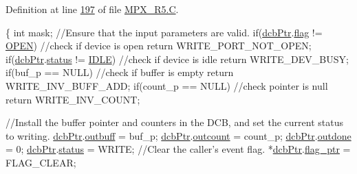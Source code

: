 Definition at line \hyperlink{_m_p_x___r5_8_c_source_l00197}{197} of file \hyperlink{_m_p_x___r5_8_c_source}{MPX\_\-R5.C}.




\begin{DoxyCode}
                                                \{
                \textcolor{keywordtype}{int} mask; 
                \textcolor{comment}{//Ensure that the input parameters are valid. }
                \textcolor{keywordflow}{if}(\hyperlink{_m_p_x___r5_8h_acf6724d515070007ff4ac39c32640311}{dcbPtr}.\hyperlink{structdevice_ac2d4a1d39c1a5a858d88f2482d6900c8}{flag} != \hyperlink{_m_p_x___r5_8h_a1354b70ac6803a06beebe84f61b5f95b}{OPEN}) \textcolor{comment}{//check if device is open }
                        \textcolor{keywordflow}{return} WRITE\_PORT\_NOT\_OPEN; 
                \textcolor{keywordflow}{if}(\hyperlink{_m_p_x___r5_8h_acf6724d515070007ff4ac39c32640311}{dcbPtr}.\hyperlink{structdevice_aaaefcdae0117d89bef5340a1e3f432e1}{status} != \hyperlink{_m_p_x___r5_8h_a9c21a7caee326d7803b94ae1952b27ca}{IDLE}) \textcolor{comment}{//check if device is idle }
                        \textcolor{keywordflow}{return} WRITE\_DEV\_BUSY; 
                \textcolor{keywordflow}{if}(buf\_p == NULL) \textcolor{comment}{//check if buffer is empty }
                        \textcolor{keywordflow}{return} WRITE\_INV\_BUFF\_ADD; 
                \textcolor{keywordflow}{if}(count\_p == NULL) \textcolor{comment}{//check pointer is null }
                        \textcolor{keywordflow}{return} WRITE\_INV\_COUNT; 
                
                \textcolor{comment}{//Install the buffer pointer and counters in the DCB, and set the
       current status to writing. }
                \hyperlink{_m_p_x___r5_8h_acf6724d515070007ff4ac39c32640311}{dcbPtr}.\hyperlink{structdevice_a32acea82810b51d93df2d3ced6cdffb7}{outbuff} = buf\_p; 
                \hyperlink{_m_p_x___r5_8h_acf6724d515070007ff4ac39c32640311}{dcbPtr}.\hyperlink{structdevice_ae597c46dee282a47174100b12525b424}{outcount} = count\_p; 
                \hyperlink{_m_p_x___r5_8h_acf6724d515070007ff4ac39c32640311}{dcbPtr}.\hyperlink{structdevice_ab7c43127bcb340d678131fd04c37ba05}{outdone} = 0; 
                \hyperlink{_m_p_x___r5_8h_acf6724d515070007ff4ac39c32640311}{dcbPtr}.\hyperlink{structdevice_aaaefcdae0117d89bef5340a1e3f432e1}{status} = WRITE;
                \textcolor{comment}{//Clear the caller's event flag. }
                *\hyperlink{_m_p_x___r5_8h_acf6724d515070007ff4ac39c32640311}{dcbPtr}.\hyperlink{structdevice_aa14e67b7bd4e2bc5751268f0be91983f}{flag_ptr} = FLAG\_CLEAR; 
                

\end{DoxyCode}
